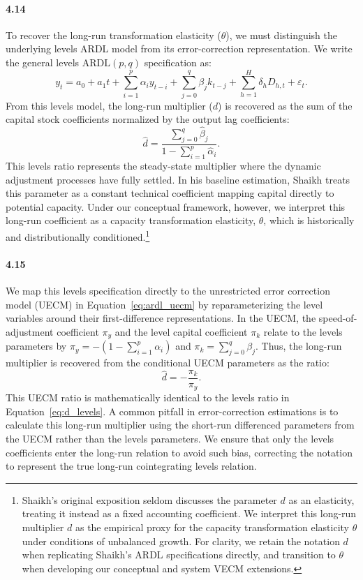 \paragraph{4.14}
To recover the long-run transformation elasticity ($\theta$), we must distinguish the underlying levels ARDL model from its error-correction representation. We write the general levels $\text{ARDL}(p, q)$ specification as:
\begin{equation}
y_t = a_0 + a_1 t + \sum_{i=1}^p \alpha_i y_{t-i} + \sum_{j=0}^q \beta_j k_{t-j} + \sum_{h=1}^H \delta_h D_{h,t} + \varepsilon_t .
\label{eq:ardl_levels}
\end{equation}
From this levels model, the long-run multiplier ($d$) is recovered as the sum of the capital stock coefficients normalized by the output lag coefficients:
\begin{equation}
\hat{d} = \frac{\sum_{j=0}^q \hat{\beta}_j}{1 - \sum_{i=1}^p \hat{\alpha}_i} .
\label{eq:d_levels}
\end{equation}
This levels ratio represents the steady-state multiplier where the dynamic adjustment processes have fully settled. In his baseline estimation, Shaikh treats this parameter as a constant technical coefficient mapping capital directly to potential capacity. Under our conceptual framework, however, we interpret this long-run coefficient as a capacity transformation elasticity, $\theta$, which is historically and distributionally conditioned.\footnote{Shaikh's original exposition \citep{Shaikh2016} seldom discusses the parameter $d$ as an elasticity, treating it instead as a fixed accounting coefficient. We interpret this long-run multiplier $d$ as the empirical proxy for the capacity transformation elasticity $\theta$ under conditions of unbalanced growth. For clarity, we retain the notation $d$ when replicating Shaikh's ARDL specifications directly, and transition to $\theta$ when developing our conceptual and system VECM extensions.}

\paragraph{4.15}
We map this levels specification directly to the unrestricted error correction model (UECM) in Equation~\eqref{eq:ardl_uecm} by reparameterizing the level variables around their first-difference representations. In the UECM, the speed-of-adjustment coefficient $\pi_y$ and the level capital coefficient $\pi_k$ relate to the levels parameters by $\pi_y = -(1 - \sum_{i=1}^p \alpha_i)$ and $\pi_k = \sum_{j=0}^q \beta_j$. Thus, the long-run multiplier is recovered from the conditional UECM parameters as the ratio:
\begin{equation}
\hat{d} = -\frac{\pi_k}{\pi_y} .
\label{eq:d_recovery}
\end{equation}
This UECM ratio is mathematically identical to the levels ratio in Equation~\eqref{eq:d_levels}. A common pitfall in error-correction estimations is to calculate this long-run multiplier using the short-run differenced parameters from the UECM rather than the levels parameters. We ensure that only the levels coefficients enter the long-run relation to avoid such bias, correcting the notation to represent the true long-run cointegrating levels relation.


